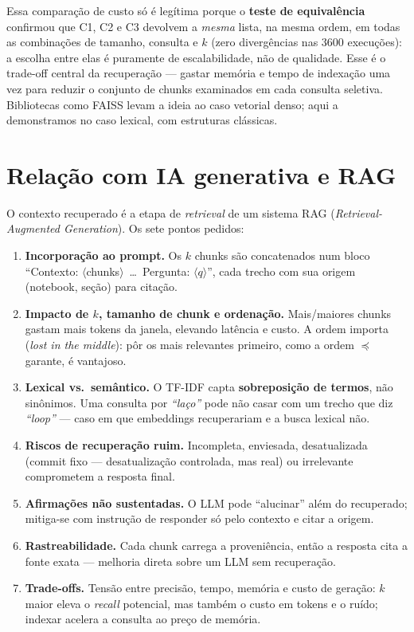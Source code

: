 \documentclass[11pt,a4paper]{article}
\begin{document}
Essa comparação de custo só é legítima porque o \textbf{teste de equivalência} confirmou que C1, C2 e C3
devolvem a \emph{mesma} lista, na mesma ordem, em todas as combinações de tamanho, consulta e $k$ (zero
divergências nas 3600 execuções): a escolha entre elas é puramente de escalabilidade, não de qualidade.
Esse é o trade-off central da recuperação --- gastar memória e tempo de indexação uma vez para reduzir o
conjunto de chunks examinados em cada consulta seletiva. Bibliotecas como FAISS levam a ideia ao caso
vetorial denso; aqui a demonstramos no caso lexical, com estruturas clássicas.

\section{Relação com IA generativa e RAG}\label{sec:rag}
O contexto recuperado é a etapa de \emph{retrieval} de um sistema RAG
(\emph{Retrieval-Augmented Generation}). Os sete pontos pedidos:
\begin{enumerate}[leftmargin=1.6em,itemsep=2pt]
\item \textbf{Incorporação ao prompt.} Os $k$ chunks são concatenados num bloco ``Contexto:
$\langle$chunks$\rangle$\ \dots\ Pergunta: $\langle q\rangle$'', cada trecho com sua origem (notebook,
seção) para citação.
\item \textbf{Impacto de $k$, tamanho de chunk e ordenação.} Mais/maiores chunks gastam mais tokens da
janela, elevando latência e custo. A ordem importa (\emph{lost in the middle}): pôr os mais relevantes
primeiro, como a ordem $\preceq$ garante, é vantajoso.
\item \textbf{Lexical vs.\ semântico.} O TF-IDF capta \textbf{sobreposição de termos}, não sinônimos.
Uma consulta por \emph{``laço''} pode não casar com um trecho que diz \emph{``loop''} --- caso em que
embeddings recuperariam e a busca lexical não.
\item \textbf{Riscos de recuperação ruim.} Incompleta, enviesada, desatualizada (commit fixo ---
desatualização controlada, mas real) ou irrelevante comprometem a resposta final.
\item \textbf{Afirmações não sustentadas.} O LLM pode ``alucinar'' além do recuperado; mitiga-se com
instrução de responder só pelo contexto e citar a origem.
\item \textbf{Rastreabilidade.} Cada chunk carrega a proveniência, então a resposta cita a fonte
exata --- melhoria direta sobre um LLM sem recuperação.
\item \textbf{Trade-offs.} Tensão entre precisão, tempo, memória e custo de geração: $k$ maior eleva o
\emph{recall} potencial, mas também o custo em tokens e o ruído; indexar acelera a consulta ao preço
de memória.
\end{enumerate}
\end{document}
